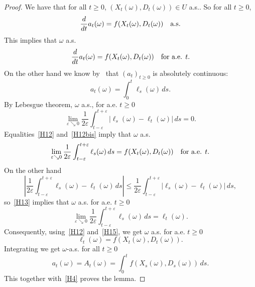 \documentclass[10pt]{amsart}
\theoremstyle{plain}
\theoremstyle{definition}
\let\f\frac
\let\e\varepsilon
\let\om\omega
\begin{document}
\begin{proof}
We have that for all $t\ge 0$, $(X_t(\om), D_t(\om))\in U$ a.s.. So for all $t\ge 0$,\vspace*{-3pt}
\begin{equation}
\f{d}{dt}a_t(\om)=f(X_t(\om), D_t(\om))\quad\hbox{a.s.}
\end{equation}
This implies that $\om$ a.s.\vspace*{-3pt}
\begin{equation}
\label{H12}
\f{d}{dt}a_t(\om)=f(X_t(\om), D_t(\om))\quad\hbox{for a.e. $t$}.
\end{equation}
On the other hand we know by~\cite[Th.\,10]{Meyer-Zheng:84} that $(a_t)_{t\ge 0}$ is absolutely continuous:\vspace*{-3pt}
\begin{equation}
\label{H12bis}
a_t(\om)=\int_0^t \ell_s(\om)\, ds.
\end{equation}
By Lebesgue theorem, $\om$ a.s., for a.e. $t\ge 0$\vspace*{-3pt}
\begin{equation}
\label{H13}
\lim_{\e \searrow 0} \f1{2\e}\int_{t-\e}^{t+\e}|\ell_s(\om)-\ell_t(\om)|\, ds=0.
\end{equation}
Equalities~\eqref{H12} and~\eqref{H12bis} imply that $\om$ a.s.\vspace*{-3pt}
\begin{equation}
\lim_{\e \searrow 0} \f1{2\e}\int_{t-\e}^{t+\e}\ell_s(\om)\, ds=f(X_t(\om), D_t(\om))\quad\hbox{for a.e. $ t$}.
\end{equation}
On the other hand\vspace*{-3pt}
\[
\left|\f1{2\e} \int_{t-\e}^{t+\e}\ell_s(\om)-\ell_t(\om)\, ds \right|\le \f1{2\e}\int_{t-\e}^{t+\e}|\ell_s(\om)-\ell_t(\om)|\, ds,
\]
so~\eqref{H13} implies that $\om$ a.s. for a.e. $t\ge 0$\vspace*{-3pt}
\begin{equation}
\label{H15}
\lim_{\e \searrow 0} \f1{2\e}\int_{t-\e}^{t+\e}\ell_s(\om)\, ds=\ell_t(\om).
\end{equation}
Consequently, using~\eqref{H12} and~\eqref{H15}, we get $\om$ a.s. for a.e. $t\ge 0$\vspace*{-3pt}
\begin{equation}
\ell_t(\om)=f(X_t(\om), D_t(\om)).
\end{equation}
Integrating we get $\om$-a.s. for all $t\ge 0$\vspace*{-3pt}
\begin{equation}
a_t(\om)=A_t(\om)=\int_0^t f(X_s(\om), D_s(\om))\, ds.
\end{equation}
This together with~\eqref{H4} proves the lemma.
\end{proof}
\end{document}
